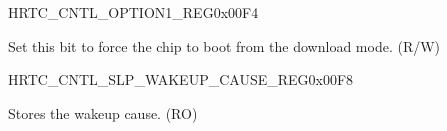 \begin{register}{H}{RTC\_CNTL\_OPTION1\_REG}{0x00F4}\label{regdesc:RTCCNTLOPTION1REG}
%
%
\regnewline%
\begin{regdesc}\begin{reglist}
\label{fielddesc:RTCCNTLFORCEDOWNLOADBOOT}\item [RTC\_CNTL\_FORCE\_DOWNLOAD\_BOOT] Set this bit to force the chip to boot from the download mode. (R/W)
\end{reglist}\end{regdesc}
\end{register}


\begin{register}{H}{RTC\_CNTL\_SLP\_WAKEUP\_CAUSE\_REG}{0x00F8}\label{regdesc:RTCCNTLSLPWAKEUPCAUSEREG}
%
%
\regnewline%
\begin{regdesc}\begin{reglist}
\label{fielddesc:RTCCNTLWAKEUPCAUSE}\item [RTC\_CNTL\_WAKEUP\_CAUSE] Stores the wakeup cause.  (RO)
\end{reglist}\end{regdesc}
\end{register}



